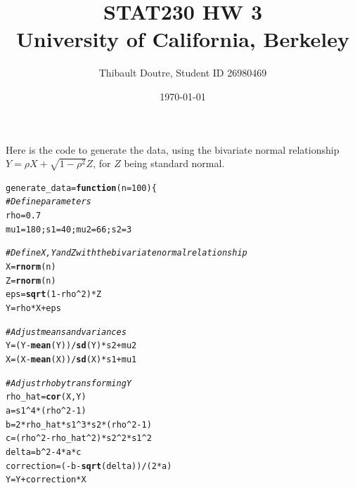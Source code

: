 \documentclass[11pt]{article}\usepackage[]{graphicx}\usepackage[]{color}
\author{Thibault Doutre, Student ID 26980469}
\title{STAT230 HW 3 \\
University of California, Berkeley}
\date{\today}
\makeatletter
\newcommand{\hlnum}[1]{\textcolor[rgb]{0.686,0.059,0.569}{#1}}%
\newcommand{\hlcom}[1]{\textcolor[rgb]{0.678,0.584,0.686}{\textit{#1}}}%
\newcommand{\hlopt}[1]{\textcolor[rgb]{0,0,0}{#1}}%
\newcommand{\hlstd}[1]{\textcolor[rgb]{0.345,0.345,0.345}{#1}}%
\newcommand{\hlkwa}[1]{\textcolor[rgb]{0.161,0.373,0.58}{\textbf{#1}}}%
\newcommand{\hlkwb}[1]{\textcolor[rgb]{0.69,0.353,0.396}{#1}}%
\newcommand{\hlkwc}[1]{\textcolor[rgb]{0.333,0.667,0.333}{#1}}%
\newcommand{\hlkwd}[1]{\textcolor[rgb]{0.737,0.353,0.396}{\textbf{#1}}}%
\newenvironment{kframe}{%
 \def\at@end@of@kframe{}%
 \ifinner\ifhmode%
  \def\at@end@of@kframe{\end{minipage}}%
  \begin{minipage}{\columnwidth}%
 \fi\fi%
 \def\FrameCommand##1{\hskip\@totalleftmargin \hskip-\fboxsep
 \colorbox{shadecolor}{##1}\hskip-\fboxsep
     \hskip-\linewidth \hskip-\@totalleftmargin \hskip\columnwidth}%
 \MakeFramed {\advance\hsize-\width
   \@totalleftmargin\z@ \linewidth\hsize
   \@setminipage}}%
 {\par\unskip\endMakeFramed%
 \at@end@of@kframe}
\newenvironment{knitrout}{}{} %
\makeatother
\begin{document}
\maketitle

\section{} 
Here is the code to generate the data, using the bivariate normal relationship $Y=\rho X +\sqrt{1-\rho^2} Z$, for $Z$ being standard normal.
\begin{knitrout}
\color{fgcolor}\begin{kframe}
\begin{alltt}
\hlstd{generate_data} \hlkwb{=} \hlkwa{function}\hlstd{(}\hlkwc{n} \hlstd{=} \hlnum{100}\hlstd{)\{}
  \hlcom{# Define parameters}
  \hlstd{rho} \hlkwb{=} \hlnum{0.7}
  \hlstd{mu1}\hlkwb{=}\hlnum{180}\hlstd{; s1}\hlkwb{=}\hlnum{40}\hlstd{; mu2}\hlkwb{=}\hlnum{66}\hlstd{; s2}\hlkwb{=}\hlnum{3}

  \hlcom{# Define X, Y and Z with the bivariate normal relationship}
  \hlstd{X} \hlkwb{=} \hlkwd{rnorm}\hlstd{(n)}
  \hlstd{Z} \hlkwb{=} \hlkwd{rnorm}\hlstd{(n)}
  \hlstd{eps} \hlkwb{=} \hlkwd{sqrt}\hlstd{(}\hlnum{1}\hlopt{-}\hlstd{rho}\hlopt{^}\hlnum{2}\hlstd{)} \hlopt{*} \hlstd{Z}
  \hlstd{Y} \hlkwb{=} \hlstd{rho} \hlopt{*} \hlstd{X} \hlopt{+} \hlstd{eps}

  \hlcom{# Adjust means and variances}
  \hlstd{Y} \hlkwb{=} \hlstd{(Y}\hlopt{-}\hlkwd{mean}\hlstd{(Y))}\hlopt{/}\hlkwd{sd}\hlstd{(Y)}\hlopt{*}\hlstd{s2}\hlopt{+}\hlstd{mu2}
  \hlstd{X} \hlkwb{=} \hlstd{(X}\hlopt{-}\hlkwd{mean}\hlstd{(X))}\hlopt{/}\hlkwd{sd}\hlstd{(X)}\hlopt{*}\hlstd{s1}\hlopt{+}\hlstd{mu1}

  \hlcom{# Adjust rho by transforming Y}
  \hlstd{rho_hat} \hlkwb{=} \hlkwd{cor}\hlstd{(X,Y)}
  \hlstd{a} \hlkwb{=} \hlstd{s1}\hlopt{^}\hlnum{4}\hlopt{*}\hlstd{(rho}\hlopt{^}\hlnum{2}\hlopt{-}\hlnum{1}\hlstd{)}
  \hlstd{b} \hlkwb{=} \hlnum{2}\hlopt{*}\hlstd{rho_hat}\hlopt{*}\hlstd{s1}\hlopt{^}\hlnum{3}\hlopt{*}\hlstd{s2}\hlopt{*}\hlstd{(rho}\hlopt{^}\hlnum{2}\hlopt{-}\hlnum{1}\hlstd{)}
  \hlstd{c} \hlkwb{=} \hlstd{(rho}\hlopt{^}\hlnum{2}\hlopt{-}\hlstd{rho_hat}\hlopt{^}\hlnum{2}\hlstd{)}\hlopt{*}\hlstd{s2}\hlopt{^}\hlnum{2}\hlopt{*}\hlstd{s1}\hlopt{^}\hlnum{2}
  \hlstd{delta} \hlkwb{=} \hlstd{b}\hlopt{^}\hlnum{2}\hlopt{-}\hlnum{4}\hlopt{*}\hlstd{a}\hlopt{*}\hlstd{c}
  \hlstd{correction} \hlkwb{=} \hlstd{(}\hlopt{-}\hlstd{b}\hlopt{-}\hlkwd{sqrt}\hlstd{(delta))}\hlopt{/}\hlstd{(}\hlnum{2}\hlopt{*}\hlstd{a)}
  \hlstd{Y}\hlkwb{=}\hlstd{Y}\hlopt{+}\hlstd{correction}\hlopt{*}\hlstd{X}


\end{alltt}
\end{kframe}
\end{knitrout}
\end{document}
